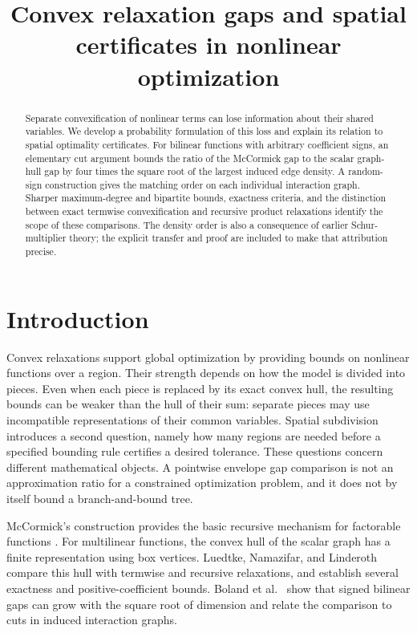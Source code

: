 \documentclass[11pt]{article}
\title{Convex relaxation gaps and spatial certificates in nonlinear optimization}
\author{}
\date{}
\begin{document}
\maketitle
\begin{abstract}
Separate convexification of nonlinear terms can lose information about their
shared variables. We develop a probability formulation of this loss and
explain its relation to spatial optimality certificates. For bilinear
functions with arbitrary coefficient signs, an elementary cut argument bounds
the ratio of the McCormick gap to the scalar graph-hull gap by four times the
square root of the largest induced edge density. A random-sign construction
gives the matching order on each individual interaction graph. Sharper
maximum-degree and bipartite bounds, exactness criteria, and the distinction
between exact termwise convexification and recursive product relaxations
identify the scope of these comparisons. The density order is also a
consequence of earlier Schur-multiplier theory; the explicit transfer and
proof are included to make that attribution precise.
\end{abstract}
\section{Introduction}\label{sec:introduction}
Convex relaxations support global optimization by providing bounds on
nonlinear functions over a region. Their strength depends on how the model
is divided into pieces. Even when each piece is replaced by its exact convex
hull, the resulting bounds can be weaker than the hull of their sum: separate
pieces may use incompatible representations of their common variables.
Spatial subdivision introduces a second question, namely how many regions
are needed before a specified bounding rule certifies a desired tolerance.
These questions concern different mathematical objects. A pointwise envelope
gap comparison is not an approximation ratio for a constrained optimization
problem, and it does not by itself bound a branch-and-bound tree.

McCormick's construction provides the basic recursive mechanism for
factorable functions \citep{McCormick1976}. For multilinear functions, the
convex hull of the scalar graph has a finite representation using box
vertices. Luedtke, Namazifar, and Linderoth \citep{Luedtke2012} compare this
hull with termwise and recursive relaxations, and establish several exactness
and positive-coefficient bounds. Boland et al.\ \citep{Boland2017} show that
signed bilinear gaps can grow with the square root of dimension and relate
the comparison to cuts in induced interaction graphs.
\end{document}
